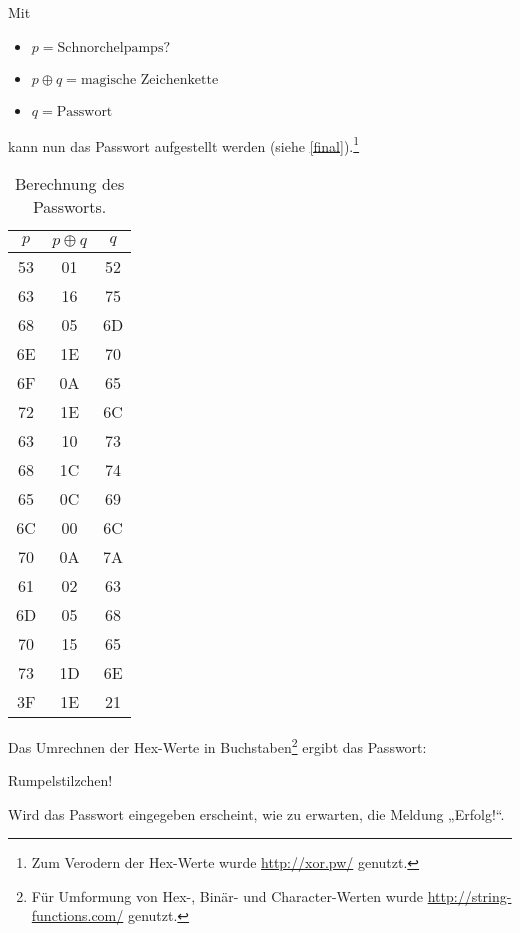 \documentclass{scrartcl}
\begin{document}
\noindent Mit
\begin{itemize}
\item $p=\text{Schnorchelpamps?}$
\item $p\oplus q = \text{magische Zeichenkette}$
\item $q=\text{Passwort}$
\end{itemize}
kann nun das Passwort aufgestellt werden (siehe \autoref{final}).\footnote{Zum Verodern der Hex-Werte wurde \url{http://xor.pw/} genutzt.}
\begin{table}[!ht]
\centering
\begin{tabular}{c c | c}
$p$ & $p \oplus q$ & $q$\\\hline
53 & 01 & 52 \\
63 & 16 & 75 \\
68 & 05 & 6D \\
6E & 1E & 70 \\
6F & 0A & 65 \\
72 & 1E & 6C \\
63 & 10 & 73 \\
68 & 1C & 74 \\
65 & 0C & 69 \\
6C & 00 & 6C \\
70 & 0A & 7A \\
61 & 02 & 63 \\
6D & 05 & 68 \\
70 & 15 & 65 \\
73 & 1D & 6E \\
3F & 1E & 21 \\
\end{tabular}
\caption{Berechnung des Passworts.}
\label{final}
\end{table}

Das Umrechnen der Hex-Werte in Buchstaben\footnote{Für Umformung von Hex-, Binär- und Character-Werten wurde \url{http://string-functions.com/} genutzt.} ergibt das Passwort:
\begin{center}
\LARGE
Rumpelstilzchen!
\end{center}

Wird das Passwort eingegeben erscheint, wie zu erwarten, die Meldung „Erfolg!“.
\end{document}
